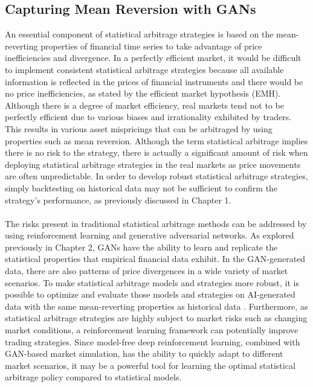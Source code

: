 \subsection{Capturing Mean Reversion with GANs}
An essential component of statistical arbitrage strategies is based on the mean-reverting properties of financial time series to take advantage of price inefficiencies and divergence. In a perfectly efficient market, it would be difficult to implement consistent statistical arbitrage strategies because all available information is reflected in the prices of financial instruments and there would be no price inefficiencies, as stated by the efficient market hypothesis (EMH). Although there is a degree of market efficiency, real markets tend not to be perfectly efficient due to various biases and irrationality exhibited by traders. This results in various asset mispricings that can be arbitraged by using properties such as mean reversion. Although the term statistical arbitrage implies there is no risk to the strategy, there is actually a significant amount of risk when deploying statistical arbitrage strategies in the real markets as price movements are often unpredictable. In order to develop robust statistical arbitrage strategies, simply backtesting on historical data may not be sufficient to confirm the strategy's performance, as previously discussed in Chapter 1.
\\ \\
The risks present in traditional statistical arbitrage methods can be addressed by using reinforcement learning and generative adversarial networks. As explored previously in Chapter 2, GANs have the ability to learn and replicate the statistical properties that empirical financial data exhibit. In the GAN-generated data, there are also patterns of price divergences in a wide variety of market scenarios. To make statistical arbitrage models and strategies more robust, it is possible to optimize and evaluate those models and strategies on AI-generated data with the same mean-reverting properties as historical data \cite{stat-arb}. Furthermore, as statistical arbitrage strategies are highly subject to market risks such as changing market conditions, a reinforcement learning framework can potentially improve trading strategies. Since model-free deep reinforcement learning, combined with GAN-based market simulation, has the ability to quickly adapt to different market scenarios, it may be a powerful tool for learning the optimal statistical arbitrage policy compared to statistical models.

